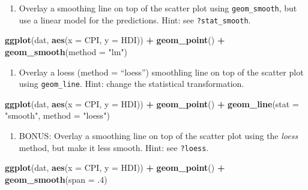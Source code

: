 \documentclass[]{book}
\newenvironment{Shaded}{\begin{snugshade}}{\end{snugshade}}
\newcommand{\KeywordTok}[1]{\textcolor[rgb]{0.13,0.29,0.53}{\textbf{#1}}}
\newcommand{\DataTypeTok}[1]{\textcolor[rgb]{0.13,0.29,0.53}{#1}}
\newcommand{\DecValTok}[1]{\textcolor[rgb]{0.00,0.00,0.81}{#1}}
\newcommand{\StringTok}[1]{\textcolor[rgb]{0.31,0.60,0.02}{#1}}
\newcommand{\OperatorTok}[1]{\textcolor[rgb]{0.81,0.36,0.00}{\textbf{#1}}}
\newcommand{\NormalTok}[1]{#1}
\providecommand{\tightlist}{%
  \setlength{\itemsep}{0pt}\setlength{\parskip}{0pt}}
\begin{document}
\begin{enumerate}
\def\labelenumi{\arabic{enumi}.}
\setcounter{enumi}{2}
\tightlist
\item
  Overlay a smoothing line on top of the scatter plot using
  \texttt{geom\_smooth}, but use a linear model for the predictions.
  Hint: see \texttt{?stat\_smooth}.
\end{enumerate}

\begin{Shaded}
\begin{Highlighting}[]
\KeywordTok{ggplot}\NormalTok{(dat, }\KeywordTok{aes}\NormalTok{(}\DataTypeTok{x =}\NormalTok{ CPI, }\DataTypeTok{y =}\NormalTok{ HDI)) }\OperatorTok{+}
\StringTok{  }\KeywordTok{geom_point}\NormalTok{() }\OperatorTok{+}
\StringTok{  }\KeywordTok{geom_smooth}\NormalTok{(}\DataTypeTok{method =} \StringTok{"lm"}\NormalTok{)}
\end{Highlighting}
\end{Shaded}

\begin{enumerate}
\def\labelenumi{\arabic{enumi}.}
\setcounter{enumi}{3}
\tightlist
\item
  Overlay a loess (method = ``loess'') smoothling line on top of the
  scatter plot using \texttt{geom\_line}. Hint: change the statistical
  transformation.
\end{enumerate}

\begin{Shaded}
\begin{Highlighting}[]
\KeywordTok{ggplot}\NormalTok{(dat, }\KeywordTok{aes}\NormalTok{(}\DataTypeTok{x =}\NormalTok{ CPI, }\DataTypeTok{y =}\NormalTok{ HDI)) }\OperatorTok{+}
\StringTok{  }\KeywordTok{geom_point}\NormalTok{() }\OperatorTok{+}
\StringTok{  }\KeywordTok{geom_line}\NormalTok{(}\DataTypeTok{stat =} \StringTok{"smooth"}\NormalTok{, }\DataTypeTok{method =} \StringTok{"loess"}\NormalTok{)}
\end{Highlighting}
\end{Shaded}

\begin{enumerate}
\def\labelenumi{\arabic{enumi}.}
\setcounter{enumi}{3}
\tightlist
\item
  BONUS: Overlay a smoothing line on top of the scatter plot using the
  \emph{loess} method, but make it less smooth. Hint: see
  \texttt{?loess}.
\end{enumerate}

\begin{Shaded}
\begin{Highlighting}[]
\KeywordTok{ggplot}\NormalTok{(dat, }\KeywordTok{aes}\NormalTok{(}\DataTypeTok{x =}\NormalTok{ CPI, }\DataTypeTok{y =}\NormalTok{ HDI)) }\OperatorTok{+}
\StringTok{  }\KeywordTok{geom_point}\NormalTok{() }\OperatorTok{+}
\StringTok{  }\KeywordTok{geom_smooth}\NormalTok{(}\DataTypeTok{span =}\NormalTok{ .}\DecValTok{4}\NormalTok{)}
\end{Highlighting}
\end{Shaded}
\end{document}

